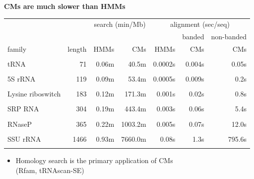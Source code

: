 \documentclass[landscape]{slides}
\begin{document}
\begin{slide}
\begin{center}
\textbf{CMs are much slower than HMMs}
\end{center}
\medskip

\begin{center}
\small
\begin{tabular}{lr|rr|rrr}
                  &        & \multicolumn{2}{c|}{search (min/Mb)} &   \multicolumn{3}{c}{alignment (sec/seq)} \\ \cline{3-7}
                  &        &        &        &         & banded  & non-banded \\
family            & length & HMMs   & CMs    &    HMMs & CMs     & CMs \\ \hline
                  &        &        &        &         &         & \\
tRNA              & 71     &  0.06m &  40.5m &  0.0002s& 0.004s  & 0.05s  \\
                  &        &        &        &         &         & \\
5S rRNA           & 119    &  0.09m &  53.4m &  0.0005s& 0.009s  & 0.2s  \\
                  &        &        &        &         &         & \\
Lysine riboswitch & 183    &  0.12m  & 171.3m &  0.001s& 0.02s   & 0.8s \\
                  &        &        &        &         &         & \\
SRP RNA           & 304    &  0.19m  & 443.4m &  0.003s&  0.06s  &  5.4s \\
                  &        &        &        &         &         &  \\
RNaseP            & 365    &  0.22m &1003.2m &  0.005s &  0.07s  & 12.0s \\
                  &        &        &        &         &         & \\
SSU rRNA          & 1466   &  0.93m &7660.0m &  0.08s  &   1.3s  & 795.6s \\
                  &        &        &        &         &         & \\
\end{tabular}
\end{center}

\begin{itemize}
\item
Homology search is the primary application of CMs \\ (Rfam, tRNAscan-SE)
\end{itemize}

\vfill

\end{slide}
\end{document}
